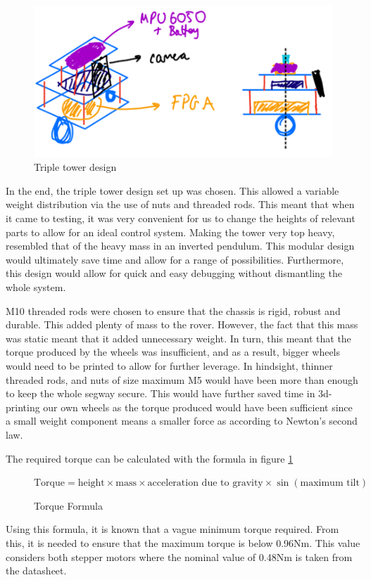 \begin{figure}
    \centering
    \includegraphics[width=\linewidth]{images/chassis-drawing3.png}
    \caption{Triple tower design}
\end{figure}

In the end, the triple tower design set up was chosen. This allowed a variable weight distribution via the use of nuts and threaded rods. This meant that when it came to testing, it was very convenient for us to change the heights of relevant parts to allow for an ideal control system. Making the tower very top heavy, resembled that of the heavy mass in an inverted pendulum. This modular design would ultimately save time and allow for a range of possibilities. Furthermore, this design would allow for quick and easy debugging without dismantling the whole system. 

M10 threaded rods were chosen to ensure that the chassis is rigid, robust and durable. This added plenty of mass to the rover. However, the fact that this mass was static meant that it added unnecessary weight. In turn, this meant that the torque produced by the wheels was insufficient, and as a result, bigger wheels would need to be printed to allow for further leverage. In hindsight, thinner threaded rods, and nuts of size maximum M5 would have been more than enough to keep the whole segway secure. This would have further saved time in 3d-printing our own wheels as the torque produced would have been sufficient since a small weight component means a smaller force as according to Newton’s second law.

The required torque can be calculated with the formula in figure \ref{formula:torque}

\begin{figure}
    \centering
    \(\text{Torque} = \text{height} \times \text{mass} \times \text{acceleration due to gravity} \times \sin (\text{maximum tilt})\)
    \caption{Torque Formula}
    \label{formula:torque}
\end{figure}
Using this formula, it is known that a vague minimum torque required. From this, it is needed to ensure that the maximum torque is below 0.96Nm. This value considers both stepper motors where the nominal value of 0.48Nm is taken from the datasheet. 

